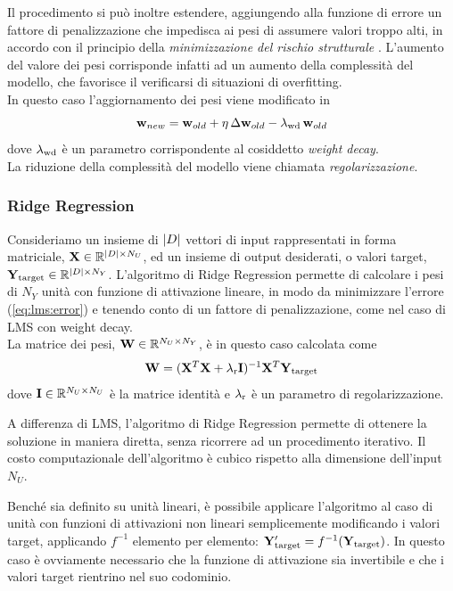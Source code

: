 Il procedimento si può inoltre estendere, aggiungendo alla funzione di errore un fattore di penalizzazione che impedisca ai
pesi di assumere valori troppo alti, in accordo con il principio della \emph{minimizzazione del rischio strutturale} \cite{Vapnik:RiskMinimization}. L'aumento del valore dei pesi corrisponde infatti ad un aumento della complessità del modello, che favorisce il verificarsi di situazioni di overfitting.\\
In questo caso l'aggiornamento dei pesi viene modificato in
\begin{equation} 
\mathbf{w}_{new} = \mathbf{w}_{old} + \eta\, \Delta\mathbf{w}_{old} - \lambda_\textup{wd}\, \mathbf{w}_{old}
\end{equation}
dove $\lambda_\textup{wd}$ è un parametro corrispondente al cosiddetto \emph{weight decay}.\\
La riduzione della complessità del modello viene chiamata \emph{regolarizzazione}.



\subsubsection*{Ridge Regression}
Consideriamo un insieme di $\lvert D\rvert$ vettori di input rappresentati in forma matriciale, $\matr{X} \in \R^{\abs{D} \times N_U}$, ed un insieme di output desiderati, o valori target, $\matr{Y}_\textup{target} \in \R^{\abs{D} \times N_Y}$.
L'algoritmo di Ridge Regression \cite{Hastie:EOSL} permette di calcolare i pesi di $N_Y$ unità con funzione di attivazione lineare, in modo da minimizzare l'errore (\ref{eq:lms:error}) e tenendo conto di un fattore di penalizzazione, come nel caso di LMS con weight decay.\\
La matrice dei pesi, $\matr{W} \in \R^{N_U \times N_Y}$, è in questo caso calcolata come
\begin{equation}
\matr{W} = (\matr{X}^T \matr{X} + \lambda_\textup{r} \matr{I})^{-1} \matr{X}^T \matr{Y}_\textup{target}
\end{equation}
dove $\matr{I} \in \R^{N_U \times N_U}$ è la matrice identità e $\lambda_\textup{r}$ è un parametro di regolarizzazione.

A differenza di LMS, l'algoritmo di Ridge Regression permette di ottenere la soluzione in maniera diretta, senza ricorrere ad un procedimento iterativo. Il costo computazionale dell'algoritmo è cubico rispetto alla dimensione dell'input $N_U$.

Benché sia definito su unità lineari, è possibile applicare l'algoritmo al caso di unità con funzioni di attivazioni non lineari semplicemente modificando i valori target, applicando $f^{-1}$ elemento per elemento: $\matr{Y}_\textup{target}' = f^{-1}(\matr{Y}_\textup{target})$. In questo caso è ovviamente necessario che la funzione di attivazione sia invertibile e che i valori target rientrino nel suo codominio.


